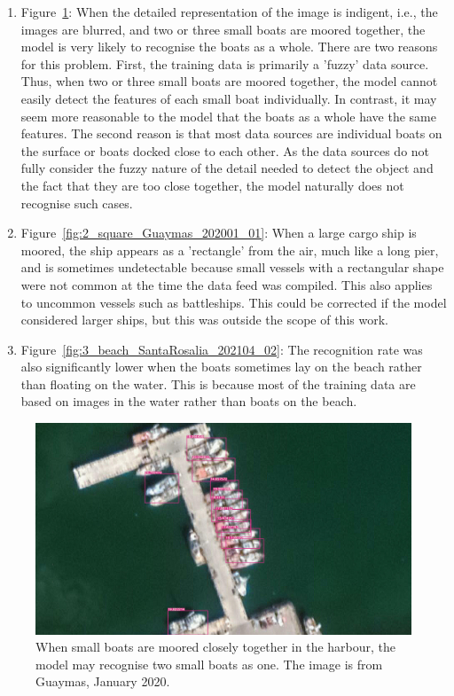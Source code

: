 \begin{enumerate}
    \item Figure~\ref{fig:1_docked_together_Guaymas_202001_20}: When the detailed representation of the image is indigent, i.e., the images are blurred, and two or three small boats are moored together, the model is very likely to recognise the boats as a whole. There are two reasons for this problem. First, the training data is primarily a 'fuzzy' data source. Thus, when two or three small boats are moored together, the model cannot easily detect the features of each small boat individually. In contrast, it may seem more reasonable to the model that the boats as a whole have the same features. The second reason is that most data sources are individual boats on the surface or boats docked close to each other. As the data sources do not fully consider the fuzzy nature of the detail needed to detect the object and the fact that they are too close together, the model naturally does not recognise such cases.

    
    \item Figure~\ref{fig:2_square_Guaymas_202001_01}: When a large cargo ship is moored, the ship appears as a 'rectangle' from the air, much like a long pier, and is sometimes undetectable because small vessels with a rectangular shape were not common at the time the data feed was compiled. This also applies to uncommon vessels such as battleships. This could be corrected if the model considered larger ships, but this was outside the scope of this work.

    \item Figure~\ref{fig:3_beach_SantaRosalia_202104_02}: The recognition rate was also significantly lower when the boats sometimes lay on the beach rather than floating on the water. This is because most of the training data are based on images in the water rather than boats on the beach.

\end{enumerate}

\begin{figure}[t]
    \centering
    \includegraphics[width=\columnwidth]{img/1_docked_together_Guaymas_202001_20.jpeg}
    \caption{When small boats are moored closely together in the harbour, the model may recognise two small boats as one. The image is from Guaymas, January 2020.}
    \label{fig:1_docked_together_Guaymas_202001_20}
\end{figure}

